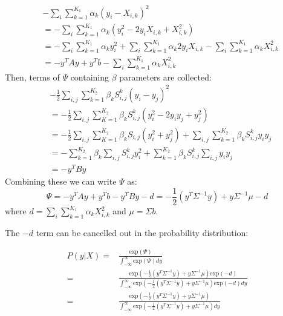 \begin{equation}
\begin{split}
& -\sum_i \sum \limits_{k=1}^{K_1} \alpha_k(y_i-X_{i,k})^2 \\
& = -\sum_i \sum \limits_{k=1}^{K_1} \alpha_k(y_i^2-2y_iX_{i,k}+X_{i,k}^2) \\
& = -\sum_i \sum \limits_{k=1}^{K_1} \alpha_k y_i^2 + \sum_i \sum\limits_{k=1}^{K_1} \alpha_k 2y_i X_{i,k} - \sum_i \sum\limits_{k=1}^{K_1} \alpha_k X_{i,k}^2\\
& = -y^TAy + y^Tb - \sum_i \sum\limits_{k=1}^{K_1} \alpha_k X_{i,k}^2
\end{split}
\end{equation}
Then, terms of $\Psi$ containing $\beta$ parameters are collected:
\begin{equation}
\begin{split}
& -\frac{1}{2}\sum_{i,j}\sum\limits_{k=1}^{K_2}\beta_k S_{i,j}^k(y_i-y_j)^2\\
& = -\frac{1}{2}\sum_{i,j}\sum\limits_{K=1}^{K_2}\beta_k S_{i,j}^k(y_i^2-2y_iy_j+y_j^2)\\
& = -\frac{1}{2}\sum_{i,j}\sum\limits_{K=1}^{K_2}\beta_k S_{i,j}(y_i^2+y_j^2) + \sum_{i,j} \sum\limits_{k=1}^{K_2}\beta_k S_{i,j}^ky_iy_j\\
& =  -\sum\limits_{k=1}^{K_2}\beta_k\sum_{i,j}S_{i,j}^ky_i^2 + \sum\limits_{k=1}^{K_2}\beta_kS_{i,j}^k\sum_{i,j}y_iy_j\\
& = -y^TBy
\end{split}
\end{equation}
Combining these we can write $\Psi$ as:
\begin{equation}
\Psi=-y^TAy + y^Tb - y^TBy - d = - \frac{1}{2}(y^T\Sigma^{-1}y)+y\Sigma^{-1}\mu - d
\end{equation}
where $d=\sum_i\sum\limits_{k=1}^{K_1}\alpha_kX_{i,k}^2$ and $\mu = \Sigma b$.

The $-d$ term can be cancelled out in the probability distribution:

\begin{equation}
\begin{split}
P(y|X)=& \frac{\text{exp}(\Psi)}{\int_{-\infty}^{\infty}\text{exp}(\Psi) dy}\\
 = & \frac{\text{exp}(- \frac{1}{2}(y^T\Sigma^{-1}y)+y\Sigma^{-1}\mu)\text{exp}(-d)}{\int_{-\infty}^{\infty}\text{exp}(- \frac{1}{2}(y^T\Sigma^{-1}y)+y\Sigma^{-1}\mu)\text{exp}(-d) dy} \\
 = & \frac{\text{exp}(- \frac{1}{2}(y^T\Sigma^{-1}y)+y\Sigma^{-1}\mu)}{\int_{-\infty}^{\infty}\text{exp}(- \frac{1}{2}(y^T\Sigma^{-1}y)+y\Sigma^{-1}\mu) dy} 
\end{split}
\end{equation}

